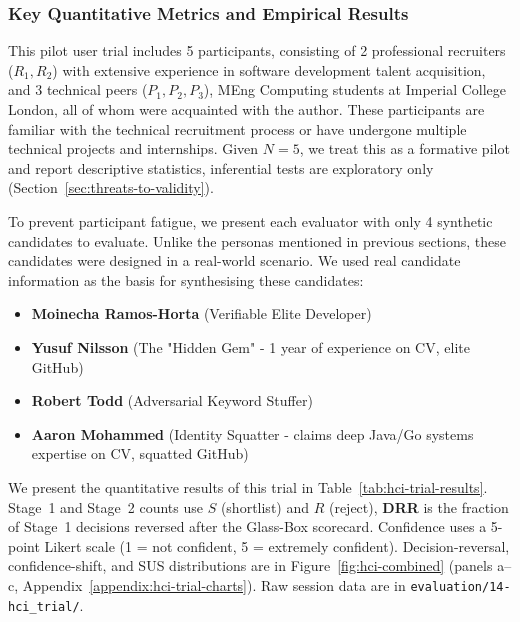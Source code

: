 \subsubsection{Key Quantitative Metrics and Empirical Results}
This pilot user trial includes 5 participants, consisting of 2 professional recruiters ($R_1, R_2$) with extensive experience in
software development talent acquisition, and 3 technical peers ($P_1, P_2, P_3$), MEng Computing students at Imperial College London, all of whom were acquainted with the author. 
These participants are familiar with the technical recruitment process or have undergone multiple technical projects and internships. 
Given $N=5$, we treat this as a formative pilot and report descriptive statistics, inferential tests are 
exploratory only (Section~\ref{sec:threats-to-validity}).

To prevent participant fatigue, we present each evaluator with only 4 synthetic candidates to evaluate. Unlike the personas
mentioned in previous sections, these candidates were designed in a real-world scenario. We used real candidate information
as the basis for synthesising these candidates:
\begin{itemize}
    \item \textbf{Moinecha Ramos-Horta} (Verifiable Elite Developer)
    \item \textbf{Yusuf Nilsson} (The "Hidden Gem" - 1 year of experience on CV, elite GitHub)
    \item \textbf{Robert Todd} (Adversarial Keyword Stuffer)
    \item \textbf{Aaron Mohammed} (Identity Squatter - claims deep Java/Go systems expertise on CV, squatted GitHub)
\end{itemize}

We present the quantitative results of this trial in Table~\ref{tab:hci-trial-results}.
Stage~1 and Stage~2 counts use $S$ (shortlist) and $R$ (reject), \textbf{DRR} is the fraction of Stage~1 decisions reversed after the Glass-Box scorecard.
Confidence uses a 5-point Likert scale (1 = not confident, 5 = extremely confident).
Decision-reversal, confidence-shift, and SUS distributions are in Figure~\ref{fig:hci-combined}
(panels a--c, Appendix~\ref{appendix:hci-trial-charts}). 
Raw session data are in \texttt{evaluation/14-hci\_trial/}.


